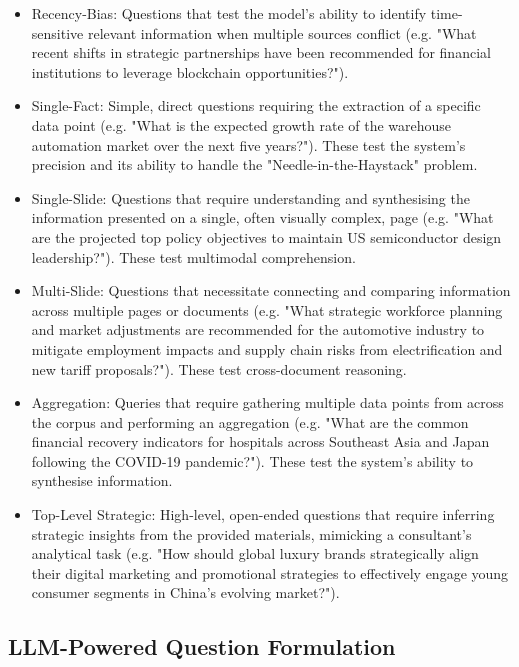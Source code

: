 \documentclass[12pt,twoside]{report}
\begin{document}
\begin{itemize}
\item{Recency-Bias}: Questions that test the model's ability to identify time-sensitive relevant information when multiple sources conflict (e.g. "What recent shifts in strategic partnerships have been recommended for financial institutions to leverage blockchain opportunities?").

\item{Single-Fact}: Simple, direct questions requiring the extraction of a specific data point (e.g. "What is the expected growth rate of the warehouse automation market over the next five years?"). These test the system's precision and its ability to handle the "Needle-in-the-Haystack" problem.

\item{Single-Slide}: Questions that require understanding and synthesising the information presented on a single, often visually complex, page (e.g. "What are the projected top policy objectives to maintain US semiconductor design leadership?"). These test multimodal comprehension.

\item{Multi-Slide}: Questions that necessitate connecting and comparing information across multiple pages or documents (e.g. "What strategic workforce planning and market adjustments are recommended for the automotive industry to mitigate employment impacts and supply chain risks from electrification and new tariff proposals?"). These test cross-document reasoning.

\item{Aggregation}: Queries that require gathering multiple data points from across the corpus and performing an aggregation (e.g. "What are the common financial recovery indicators for hospitals across Southeast Asia and Japan following the COVID-19 pandemic?"). These test the system's ability to synthesise information.

\item{Top-Level Strategic}: High-level, open-ended questions that require inferring strategic insights from the provided materials, mimicking a consultant's analytical task (e.g. "How should global luxury brands strategically align their digital marketing and promotional strategies to effectively engage young consumer segments in China's evolving market?").
\end{itemize}

\subsection{LLM-Powered Question Formulation}
\end{document}
